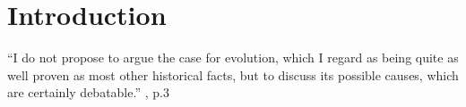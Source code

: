 \chapter{Introduction}
\label{chap:introduction}

\begin{quoteshrink}
  ``I do not propose to argue the case for evolution, which I regard as being quite as well proven as most other historical facts, but to discuss its possible causes, which are certainly debatable.''
  \hfill\citet{Haldane:1932}, p.3
\end{quoteshrink}

\noindent


